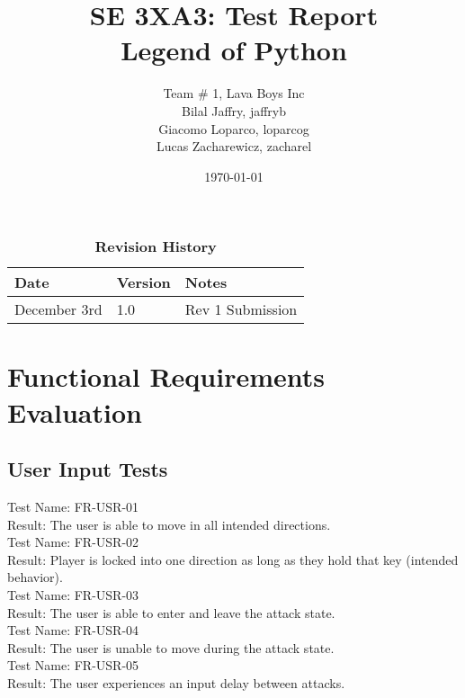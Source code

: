 \documentclass[12pt, titlepage]{article}
\title{SE 3XA3: Test Report\\Legend of Python}
\author{Team \# 1, Lava Boys Inc
		\\ Bilal Jaffry, jaffryb
		\\ Giacomo Loparco, loparcog
		\\ Lucas Zacharewicz, zacharel
}
\date{\today}
\begin{document}
\maketitle

\tableofcontents
\listoftables
\listoffigures

\begin{table}[ht]
\caption{\bf Revision History}
\begin{tabularx}{\textwidth}{p{3cm}p{2cm}X}
\toprule {\bf Date} & {\bf Version} & {\bf Notes}\\
\midrule
December 3rd & 1.0 & Rev 1 Submission\\
\bottomrule
\end{tabularx}
\end{table}

\newpage


\section{Functional Requirements Evaluation}

\subsection{User Input Tests}

Test Name: FR-USR-01\\

Result: The user is able to move in all intended directions.\\

Test Name: FR-USR-02\\

Result: Player is locked into one direction as long as they hold that key (intended behavior).\\

Test Name: FR-USR-03\\

Result: The user is able to enter and leave the attack state.\\

Test Name: FR-USR-04\\

Result: The user is unable to move during the attack state.\\

Test Name: FR-USR-05\\

Result: The user experiences an input delay between attacks.\\
\end{document}
